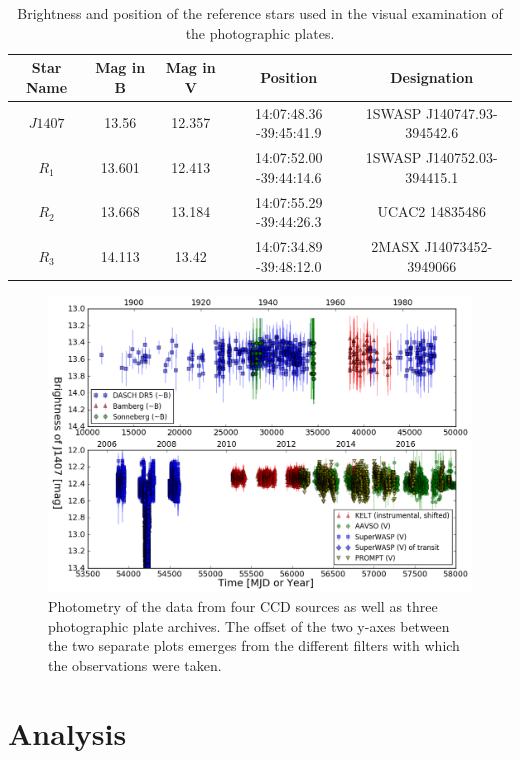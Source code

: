 \documentclass[twocolumn]{aa}
\begin{document}
\begin{table}[t]
\centering
\caption{Brightness and position of the reference stars used in the visual examination of the photographic plates.}
\label{tab:refstars}
\begin{tabular}{ccccc}
\hline
Star Name & Mag in B & Mag in V & Position & Designation \\
\hline
$J1407$ & 13.56 & 12.357 & 14:07:48.36 -39:45:41.9 & 1SWASP J140747.93-394542.6 \\
$R_1$ & 13.601 & 12.413 & 14:07:52.00 -39:44:14.6 & 1SWASP J140752.03-394415.1 \\
$R_2$ & 13.668 & 13.184 & 14:07:55.29 -39:44:26.3 & UCAC2 14835486 \\
$R_3$ & 14.113 & 13.42 & 14:07:34.89 -39:48:12.0 & 2MASX J14073452-3949066 \\
\hline
\end{tabular}
\end{table}

\begin{figure}[!ht]
\centering
\includegraphics[width=1.2\textwidth,angle=90]{double_photometry.png}
\caption{Photometry of the data from four CCD sources as well as three photographic plate archives. The offset of the two y-axes between the two separate plots emerges from the different filters with which the observations were taken.}
\label{fig_phot}
\end{figure} 

\section{Analysis}
\label{sect_analysis}
\end{document}
